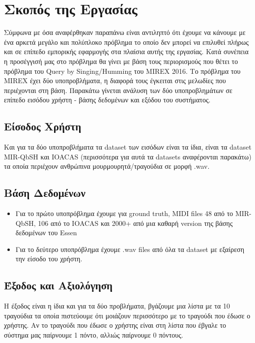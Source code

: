 \section{Σκοπός της Εργασίας}
Σύμφωνα με όσα αναφέρθηκαν παραπάνω είναι αντιληπτό ότι έχουμε να κάνουμε με
ένα αρκετά μεγάλο και πολύπλοκο πρόβλημα το οποίο δεν μπορεί να επιλυθεί πλήρως
και σε επίπεδο εμπορικής εφαρμογής στα πλαίσια αυτής της εργασίας. Κατά συνέπεια
η προσέγγισή μας στο πρόβλημα θα γίνει με βάση τους περιορισμούς που θέτει το
πρόβλημα του Query by Singing/Humming του MIREX 2016\cite{mirex}. Το πρόβλημα
του MIREX έχει δύο υποπροβλήματα, η διαφορά τους έγκειται στις μελωδίες που
περιέχονται στη βάση. Παρακάτω γίνεται ανάλυση των δύο υποπροβλημάτων σε
επίπεδο εισόδου χρήστη - βάσης δεδομένων και εξόδου του συστήματος.

\subsection{Είσοδος Χρήστη}
Και για τα δύο υποπροβλήματα τα dataset των εισόδων είναι τα ίδια, είναι τα
dataset MIR-QbSH και IOACAS (περισσότερα για αυτά τα datasets αναφέρονται
παρακάτω) τα οποία περιέχουν ανθρώπινα μουρμουρητά/τραγούδια σε μορφή .wav.

\subsection{Βάση Δεδομένων}
\begin{itemize}
	\item Για το πρώτο υποπρόβλημα έχουμε για ground truth, MIDI files 48 από το
	      MIR-QbSH, 106 από το IOACAS και 2000+ από μια καθαρή version της βάσης
	      δεδομένων του Essen \cite{esac-dataset}
	\item Για το δεύτερο υποπρόβλημα έχουμε .wav files από όλα τα dataset με
	      εξαίρεση την είσοδο του χρήστη.
\end{itemize}


\subsection{Έξοδος και Αξιολόγηση}
Η έξοδος είναι η ίδια και για τα δύο προβλήματα, βγάζουμε μια λίστα με τα 10
τραγούδια τα οποία πιστεύουμε ότι μοιάζουν περισσότερο με το τραγούδι που έδωσε
ο χρήστης. Αν το τραγούδι που έδωσε ο χρήστης είναι στη λίστα που έβγαλε το
σύστημα μας παίρνουμε 1 πόντο, αλλιώς παίρνουμε 0 πόντους.
